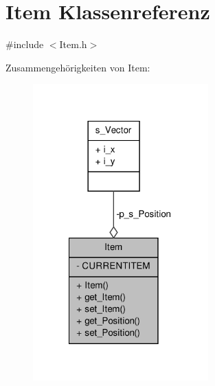 \hypertarget{class_item}{\section{Item Klassenreferenz}
\label{class_item}
}


{\ttfamily \#include $<$Item.\-h$>$}



Zusammengehörigkeiten von Item\-:
\nopagebreak
\begin{figure}[H]
\begin{center}
\leavevmode
\includegraphics[width=191pt]{class_item__coll__graph}
\end{center}
\end{figure}
